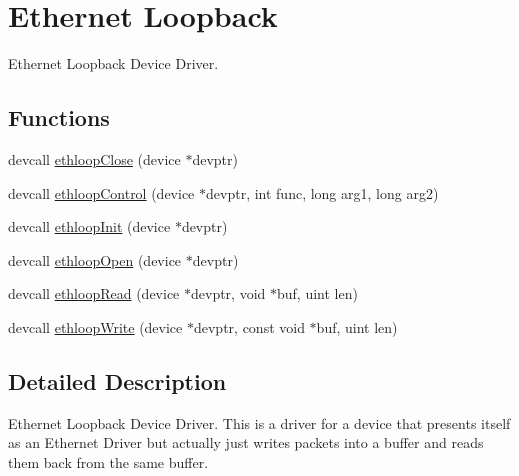 \hypertarget{group__ethloop}{\section{Ethernet Loopback}
\label{group__ethloop}
}


Ethernet Loopback Device Driver.  


\subsection*{Functions}
\begin{DoxyCompactItemize}
\item 
devcall \hyperlink{group__ethloop_ga5190bdfc4447e69bb92bbc9134c9c4e0}{ethloop\-Close} (device $\ast$devptr)
\item 
devcall \hyperlink{group__ethloop_gaa131556fa83b426e8691ed04e6791a1a}{ethloop\-Control} (device $\ast$devptr, int func, long arg1, long arg2)
\item 
devcall \hyperlink{group__ethloop_gaee123c05bdee0ccc3c23a51146b45de4}{ethloop\-Init} (device $\ast$devptr)
\item 
devcall \hyperlink{group__ethloop_gae8bf460f8195df364965d48802cb2c59}{ethloop\-Open} (device $\ast$devptr)
\item 
devcall \hyperlink{group__ethloop_ga0f1d4566b0a867a5980752ab97249274}{ethloop\-Read} (device $\ast$devptr, void $\ast$buf, uint len)
\item 
devcall \hyperlink{group__ethloop_ga6a57120dafe68d0d0c2e97572bb5759c}{ethloop\-Write} (device $\ast$devptr, const void $\ast$buf, uint len)
\end{DoxyCompactItemize}


\subsection{Detailed Description}
Ethernet Loopback Device Driver. This is a driver for a device that presents itself as an Ethernet Driver but actually just writes packets into a buffer and reads them back from the same buffer. 

